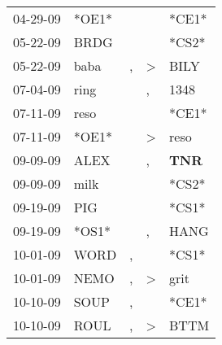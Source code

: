 \begin{supertabular}{p{0.07\textwidth}p{0.06\textwidth}p{0.02\textwidth}p{0.02\textwidth}p{0.06\textwidth}}
          04-29-09\textsuperscript{} &                            *OE1* &                  &                  &                            *CE1* \\
          05-22-09\textsuperscript{} &           BRDG\textsuperscript{} &                  &                  &                            *CS2* \\
          05-22-09\textsuperscript{} &           baba\textsuperscript{} &                , &     \textgreater &           BILY\textsuperscript{} \\
          07-04-09\textsuperscript{} &           ring\textsuperscript{} &                  &                , &           1348\textsuperscript{} \\
          07-11-09\textsuperscript{} &           reso\textsuperscript{} &                  &                  &                            *CE1* \\
          07-11-09\textsuperscript{} &                            *OE1* &                  &     \textgreater &           reso\textsuperscript{} \\
          09-09-09\textsuperscript{} &           ALEX\textsuperscript{} &                  &                , &   \textbf{TNR\textsuperscript{}} \\
          09-09-09\textsuperscript{} &           milk\textsuperscript{} &                  &                  &                            *CS2* \\
          09-19-09\textsuperscript{} &            PIG\textsuperscript{} &                  &                  &                            *CS1* \\
          09-19-09\textsuperscript{} &                            *OS1* &                  &                , &           HANG\textsuperscript{} \\
          10-01-09\textsuperscript{} &           WORD\textsuperscript{} &                , &                  &                            *CS1* \\
          10-01-09\textsuperscript{} &           NEMO\textsuperscript{} &                , &     \textgreater &           grit\textsuperscript{} \\
          10-10-09\textsuperscript{} &           SOUP\textsuperscript{} &                , &                  &                            *CE1* \\
          10-10-09\textsuperscript{} &           ROUL\textsuperscript{} &                , &     \textgreater &           BTTM\textsuperscript{} \\

\end{supertabular}
